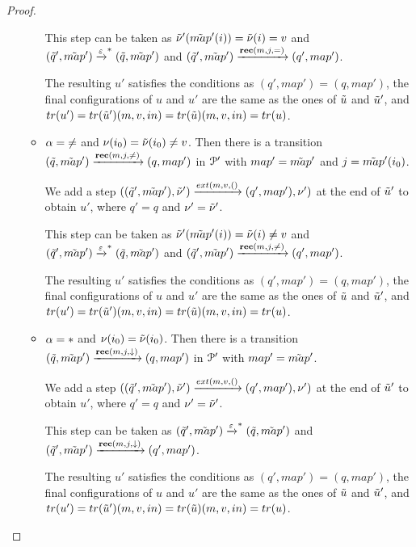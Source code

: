 \begin{proof}
\begin{itemize}
\begin{itemize}
			This step can be taken as $\Tilde{\nu}'(\Tilde{map}'(i)) = \Tilde{\nu}(i) = v$ and $(\Tilde{q}', \Tilde{map}') \xrightarrow{\varepsilon}^* (\Tilde{q}, \Tilde{map}')$ and $(\Tilde{q}', \Tilde{map}') \xrightarrow{\textbf{rec}(m, j, {=})} (q', map')$.
			
			The resulting $u'$ satisfies the conditions as $(q', map') = (q, map')$, the final configurations of $u$ and $u'$ are the same as the ones of $\Tilde{u}$ and $\Tilde{u}'$, and $\trace{u'} = \trace{\Tilde{u}'} (m,v,in) = \trace{\Tilde{u}} (m,v,in) = \trace{u}$.
			
			\item $\alpha = {\ne}$ and $\nu(i_0) = \Tilde{\nu}(i_0) \neq v$. Then there is a transition $(\Tilde{q}, \Tilde{map}') \xrightarrow{\textbf{rec}(m, j, {\ne})} (q, map')$ in $\mathcal{P}'$ with $map' = \Tilde{map}'$ and $j = \Tilde{map}'(i_0)$.
			
			We add a step $((\Tilde{q}', \Tilde{map}'), \Tilde{\nu}') \extbr{m, v} ((q', map'), \nu')$ at the end of $\Tilde{u}'$ to obtain $u'$, where $q' = q$ and $\nu' = \Tilde{\nu}'$.
			
			This step can be taken as $\Tilde{\nu}'(\Tilde{map}'(i)) = \Tilde{\nu}(i) \neq v$ and $(\Tilde{q}', \Tilde{map}') \xrightarrow{\varepsilon}^* (\Tilde{q}, \Tilde{map}')$ and $(\Tilde{q}', \Tilde{map}') \xrightarrow{\textbf{rec}(m, j, {\ne})} (q', map')$.
			
			The resulting $u'$ satisfies the conditions as $(q', map') = (q, map')$, the final configurations of $u$ and $u'$ are the same as the ones of $\Tilde{u}$ and $\Tilde{u}'$, and $\trace{u'} = \trace{\Tilde{u}'} (m,v,in) = \trace{\Tilde{u}} (m,v,in) = \trace{u}$.
			
			\item $\alpha = {*}$ and $\nu(i_0) = \Tilde{\nu}(i_0)$. Then there is a transition $(\Tilde{q}, \Tilde{map}') \xrightarrow{\textbf{rec}(m, j, \downarrow)} (q, map')$ in $\mathcal{P}'$ with $map' = \Tilde{map}'$.
			
			We add a step $((\Tilde{q}', \Tilde{map}'), \Tilde{\nu}') \extbr{m, v} ((q', map'), \nu')$ at the end of $\Tilde{u}'$ to obtain $u'$, where $q' = q$ and $\nu' = \Tilde{\nu}'$.
			
			This step can be taken as $(\Tilde{q}', \Tilde{map}') \xrightarrow{\varepsilon}^* (\Tilde{q}, \Tilde{map}')$ and $(\Tilde{q}', \Tilde{map}') \xrightarrow{\textbf{rec}(m, j, \downarrow)} (q', map')$.
			
			The resulting $u'$ satisfies the conditions as $(q', map') = (q, map')$, the final configurations of $u$ and $u'$ are the same as the ones of $\Tilde{u}$ and $\Tilde{u}'$, and $\trace{u'} = \trace{\Tilde{u}'} (m,v,in) = \trace{\Tilde{u}} (m,v,in) = \trace{u}$. 
		\end{itemize}
		

\end{itemize}
\end{proof}
